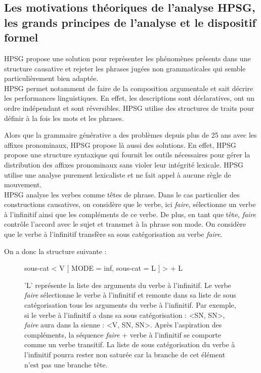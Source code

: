 \newpage

\subsection{Les motivations théoriques de l'analyse HPSG, les grands principes de l'analyse et le dispositif formel}

HPSG propose une solution pour représenter les phénomènes présents dans une structure causative et rejeter les phrases jugées non grammaticales qui semble particulièrement bien adaptée.\\

HPSG permet notamment de faire de la composition argumentale et sait décrire les performances linguistiques.
En effet, les descriptions sont déclaratives, ont un ordre indépendant et sont réversibles.
HPSG utilise des structures de traits pour définir à la fois les mots et les phrases.

Alors que la grammaire générative a des problèmes depuis plus de 25 ans avec les affixes pronominaux, HPSG propose là aussi des solutions.
En effet, HPSG propose une structure syntaxique qui fournit les outils nécessaires pour gérer la distribution des affixes pronominaux sans violer leur intégrité lexicale.
HPSG utilise une analyse purement lexicaliste et ne fait appel à aucune règle de mouvement.\\

HPSG  analyse les verbes comme têtes de phrase.
Dans le cas particulier des constructions causatives, on considère que le verbe, ici \emph{faire}, sélectionne un verbe à l'infinitif ainsi que les compléments de ce verbe.
De plus, en tant que tête, \emph{faire} contrôle l'accord avec le sujet et transmet à la phrase son mode.
On considère que le verbe à l'infinitif transfère sa sous catégorisation au verbe \emph{faire}.

On a donc la structure suivante :

\begin{figure}[ht]
\begin{avm}
			sous-cat  < V [ MODE = inf, sous-cat = L ] > + L

\end{avm}
\caption{'L' représente la liste des arguments du verbe à l'infinitif.
  Le verbe \emph{faire} sélectionne le verbe à l'infinitif et remonte dans sa liste de sous catégorisation tous les arguments du verbe à l'infinitif.
Par exemple, si le verbe à l'infinitif a dans sa sous catégorisation : <SN, SN>, \emph{faire} aura dans la sienne : <V, SN, SN>.
Après l'aspiration des compléments, la séquence \emph{faire} + verbe à l'infinitif se comporte comme un verbe transitif.
La liste de sous catégorisation du verbe à l'infinitif pourra rester non saturée car la branche de cet élément n'est pas une branche tête.}
\end{figure}

